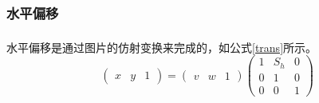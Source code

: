 \documentclass[UTF8]{ctexart}
\newcommand{\upcite}[1]{\textsuperscript{\textsuperscript{\cite{#1}}}}
\begin{document}
\subsubsection{水平偏移}

水平偏移是通过图片的仿射变换来完成的，如公式\ref{trans}所示\upcite{dip}。
\begin{equation}\label{trans}
	\left( \begin{array}{ccc}
		x & y & 1
		\end{array} \right)
		=
	\left( \begin{array}{ccc}
		v & w & 1
		\end{array} \right) 
	\left( \begin{array}{ccc}
		1  & S_{h}  & 0  \\
		0  & 1 & 0 \\
		0 & 0 & 1 
		\end{array} \right)
\end{equation}
\end{document}

